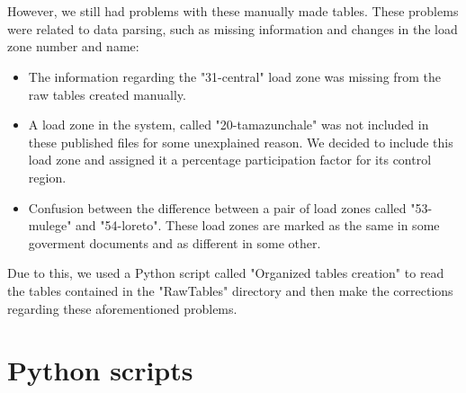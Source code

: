 \documentclass{article}
\begin{document}
\\
\\However, we still had problems with these manually made tables. These problems were related to data parsing, such as missing information and changes in the load zone number and name:
\begin{itemize}
\item The information regarding the "31-central" load zone was missing from the raw tables created manually.
\item A load zone in the system, called "20-tamazunchale" was not included in these published files for some unexplained reason. We decided to include this load zone and assigned it a percentage participation factor for its control region.
\item Confusion between the difference between a pair of load zones called "53-mulege" and "54-loreto". These load zones are marked as the same in some goverment documents and as different in some other. 
\end{itemize}
Due to this, we used a Python script called "Organized tables creation" to read the tables contained in the "RawTables" directory and then make the corrections regarding these aforementioned problems.
\section{Python scripts}
\end{document}
